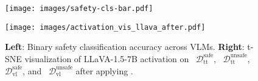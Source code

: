 \begin{figure}[t]
    \begin{minipage}{0.49\linewidth}
        \begin{center}
        \texttt{[image: images/safety-cls-bar.pdf]}
        \end{center}
    \end{minipage}
    \hfill
    \begin{minipage}{0.49\linewidth}
        \begin{center}
        \vspace{-7pt}
        \texttt{[image: images/activation\_vis\_llava\_after.pdf]}
        \end{center}
    \end{minipage}
    \caption{\textbf{Left}: Binary safety classification accuracy across VLMs. \textbf{Right}: t-SNE visualization of LLaVA-1.5-7B activation on \yellowcircle\ $\mathcal{D}_\text{tt}^\text{safe}$, \purplecircle\ $\mathcal{D}_\text{tt}^\text{unsafe}$, \greencircle\ $\mathcal{D}_\text{vl}^\text{safe}$, and \bluecircle\ $\mathcal{D}_\text{vl}^\text{unsafe}$ after applying \OursMethod.}
    \vspace{-20pt}
    \label{fig:exp-safety-cls-acc-vis}
\end{figure}



